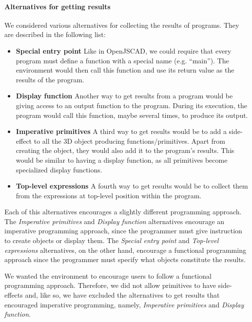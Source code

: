 \paragraph{Alternatives for getting results}
We considered various alternatives for collecting the results of programs.
They are described in the following list:
\begin{itemize}
  \item {\bf Special entry point} Like in OpenJSCAD, we could require that every program must define a function with a special name (e.g. ``main'').
  The environment would then call this function and use its return value as the results of the program.

  \item {\bf Display function} Another way to get results from a program would be giving access to an output function to the program.
  During its execution, the program would call this function, maybe several times, to produce its output.

  \item {\bf Imperative primitives} A third way to get results would be to add a side-effect to all the 3D object producing functions/primitives.
  Apart from creating the object, they would also add it to the program's results.
  This would be similar to having a display function, as all primitives become specialized display functions.

  \item {\bf Top-level expressions} A fourth way to get results would be to collect them from the expressions at top-level position within the program.
\end{itemize}

Each of this alternatives encourages a slightly different programming approach.
The {\it Imperative primitives} and {\it Display function} alternatives encourage an imperative programming approach, since the programmer must give instruction to create objects or display them.
The {\it Special entry point} and {\it Top-level expressions} alternatives, on the other hand, encourage a functional programming approach since the programmer must specify what objects constitute the results.

We wanted the environment to encourage users to follow a functional programming approach.
Therefore, we did not allow primitives to have side-effects and, like so, we have excluded the alternatives to get results that encouraged imperative programming, namely, {\it Imperative primitives} and {\it Display function}.

